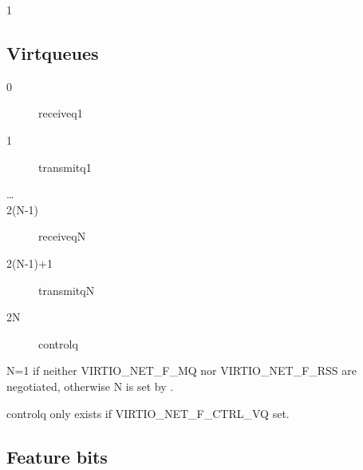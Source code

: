  1

\subsection{Virtqueues}\label{sec:Device Types / Network Device / Virtqueues}

\begin{description}
\item[0] receiveq1
\item[1] transmitq1
\item[\ldots]
\item[2(N-1)] receiveqN
\item[2(N-1)+1] transmitqN
\item[2N] controlq
\end{description}

 N=1 if neither VIRTIO_NET_F_MQ nor VIRTIO_NET_F_RSS are negotiated, otherwise N is set by
 .

 controlq only exists if VIRTIO_NET_F_CTRL_VQ set.

\subsection{Feature bits}\label{sec:Device Types / Network Device / Feature bits}

